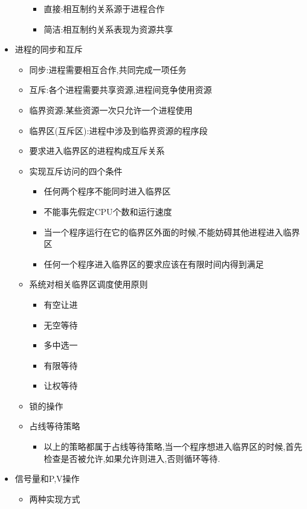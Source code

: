 \documentclass[a4paper,12pt,notitlepage]{article}
\begin{document}
\begin{itemize}
\begin{itemize}
		\begin{itemize}
			\item 直接:相互制约关系源于进程合作
			\item 简洁:相互制约关系表现为资源共享
		\end{itemize}
	\end{itemize}
	\item 进程的同步和互斥
	\begin{itemize}
		\item 同步:进程需要相互合作,共同完成一项任务
		\item 互斥:各个进程需要共享资源,进程间竞争使用资源
		\item 临界资源:某些资源一次只允许一个进程使用
		\item 临界区(互斥区):进程中涉及到临界资源的程序段
		\item 要求进入临界区的进程构成互斥关系
		\item 实现互斥访问的四个条件
		\begin{itemize}
			\item 任何两个程序不能同时进入临界区
			\item 不能事先假定CPU个数和运行速度
			\item 当一个程序运行在它的临界区外面的时候,不能妨碍其他进程进入临界区
			\item 任何一个程序进入临界区的要求应该在有限时间内得到满足
		\end{itemize}
		\item 系统对相关临界区调度使用原则
		\begin{itemize}
			\item 有空让进
			\item 无空等待
			\item 多中选一
			\item 有限等待
			\item 让权等待
		\end{itemize}
		\item 锁的操作
		\item 占线等待策略
		\begin{itemize}
			\item 以上的策略都属于占线等待策略,当一个程序想进入临界区的时候,首先检查是否被允许,如果允许则进入,否则循环等待.
		\end{itemize}
	\end{itemize}
	\item 信号量和P,V操作
	\begin{itemize}
		\item 两种实现方式
		\begin{itemize}

\end{itemize}
\end{itemize}
\end{itemize}
\end{document}
